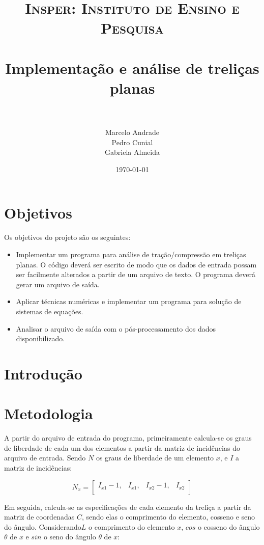 \documentclass[paper=a4, fontsize=11pt]{scrartcl}
\title{
		\usefont{OT1}{bch}{b}{n}
		\normalfont \normalsize \textsc{Insper: Instituto de Ensino e Pesquisa} \\ [25pt] %
		\horrule{0.5pt} \\[0.4cm]														  
		\huge Implementação e análise de treliças planas \\			%
		\horrule{2pt} \\[0.5cm]
}
\author{										%
		\normalfont 								\normalsize
        Marcelo Andrade\\[-3pt]		\normalsize
		Pedro Cunial\\[-3pt]		\normalsize
        Gabriela Almeida\\[-3pt]		\normalsize
}
\date{\today}
\begin{document}
	
\maketitle

\newpage

\tableofcontents

\newpage


\section{Objetivos}
Os objetivos do projeto são os seguintes:

\begin{itemize}
	\item Implementar um programa para análise de tração/compressão em
	treliças planas. O código deverá ser escrito de modo que os dados de entrada
	possam ser facilmente alterados a partir de um arquivo de texto. O programa deverá gerar um arquivo de saída.
	
	\item Aplicar técnicas numéricas e implementar um programa para
	solução de sistemas de equações. 
	
	\item Analisar o arquivo de saída com o pós-processamento dos dados
	disponibilizado. 
\end{itemize}

\section{Introdução}

\section{Metodologia}

A partir do arquivo de entrada do programa, primeiramente calcula-se os graus de liberdade de cada um dos elementos a partir da matriz de incidências do arquivo de entrada. Sendo \(N\) os graus de liberdade de um elemento \(x\), e \(I\) a matriz de incidências:


\[N_x = 
\begin{bmatrix}
I_{x1} - 1 ,& I_{x1} ,& I_{x2} - 1 ,& I_{x2}  \\
\end{bmatrix}
\]

Em seguida, calcula-se as especificações de cada elemento da treliça a partir da matriz de coordenadas \(C\), sendo elas o comprimento do elemento, cosseno e seno do ângulo. Considerando\(L\) o comprimento do elemento \(x\), \(cos\) o cosseno do ângulo \(\theta\) de \(x\) e \(sin\) o seno do ângulo \(\theta\) de \(x\):
\end{document}
